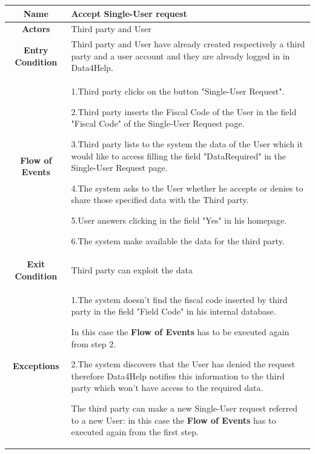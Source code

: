       \begin{table}[h!]
        \centering
        \begin{tabularx}{\linewidth}{|c|X|}
          \hline
          \textbf{Name} & Accept Single-User request\\
        	\hline
        	\textbf{Actors} & Third party and User \\
        	\hline
        	\textbf{Entry Condition} & Third party and User have already created respectively a third party and a user account and they 							are already logged in in Data4Help.\\
        	\hline
        	\textbf{Flow of Events} & 1.Third party clicks on the button "Single-User Request".

        					2.Third party inserts the Fiscal Code of the User in the field "Fiscal Code" of the Single-User 								Request page.

        					3.Third party lists to the system the data of the User which it would like to access filling the field 							"DataRequired" in the Single-User Request page.

        					4.The system asks to the User whether he accepts or denies to share those specified data with the 					Third party.

        					5.User answers clicking in the field "Yes" in his homepage.

        					6.The system make available the data for the third party.\\
        	\hline
        	\textbf{Exit Condition} & Third party can exploit the data \\
        	\hline
        	\textbf{Exceptions} & 1.The system doesn't find the fiscal code inserted by third party in the field "Field Code" in his internal 				database.

        				In this case the \textbf{Flow of Events} has to be executed again from step 2.

        				2.The system discovers that the User has denied the request therefore Data4Help notifies this 							information to the third party which won't have access to the required data.

        				The third party can 	make a new Single-User request referred to a new User: in this case the 							\textbf{Flow of Events} has to executed again from the first step.\\

          \hline
        \end{tabularx}
      \end{table}


